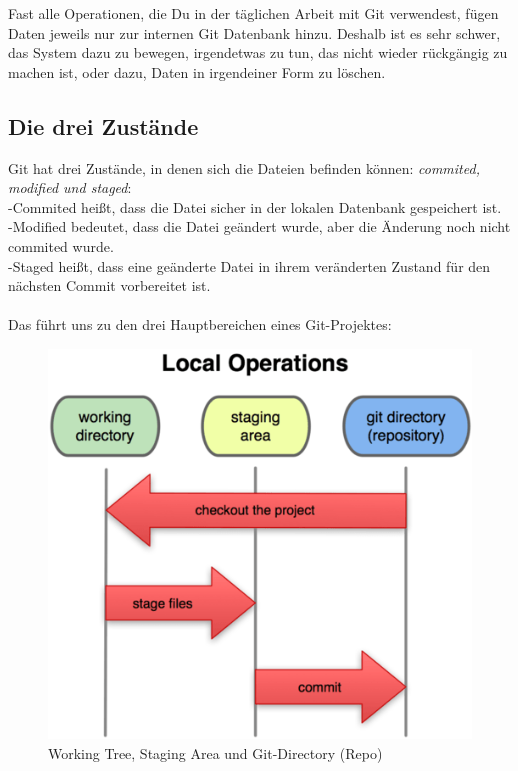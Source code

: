 \documentclass{article}
\begin{document}
Fast alle Operationen, die Du in der täglichen Arbeit mit Git verwendest, fügen Daten jeweils nur zur internen Git Datenbank hinzu. Deshalb ist es sehr schwer, das System dazu zu bewegen, irgendetwas zu tun, das nicht wieder rückgängig zu machen ist, oder dazu, Daten in irgendeiner Form zu löschen.

\subsection*{Die drei Zustände}
Git hat drei Zustände, in denen sich die Dateien befinden können: \textit{commited, modified und staged}: \\
-Commited heißt, dass die Datei sicher in der lokalen Datenbank gespeichert ist. \\
-Modified bedeutet, dass die Datei geändert wurde, aber die Änderung noch nicht commited wurde. \\
-Staged heißt, dass eine geänderte Datei in ihrem veränderten Zustand für den nächsten Commit vorbereitet ist. \\ \\
Das führt uns zu den drei Hauptbereichen eines Git-Projektes:

\begin{figure}[h!]
    \centering
    \includegraphics[width=\textwidth]{../bilder/zustand.png}
    \caption{Working Tree, Staging Area und Git-Directory (Repo)}
    \label{zustand}
\end{figure} 
\end{document}
